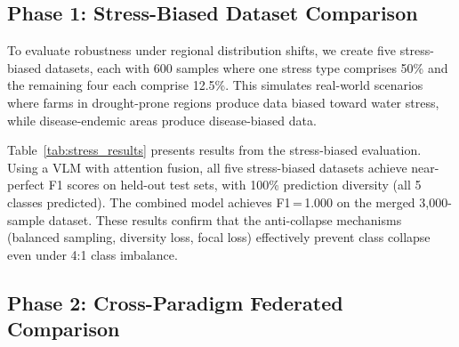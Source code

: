 \documentclass[10pt,journal,compsoc]{IEEEtran}
\begin{document}
\subsection{Phase 1: Stress-Biased Dataset Comparison}

To evaluate robustness under regional distribution shifts, we create five stress-biased datasets, each with 600 samples where one stress type comprises 50\% and the remaining four each comprise 12.5\%. This simulates real-world scenarios where farms in drought-prone regions produce data biased toward water stress, while disease-endemic areas produce disease-biased data.

\begin{table}[htbp]
\centering
\caption{Phase 1: Stress-Biased Dataset Results (Attention VLM)}
\label{tab:stress_results}
\small
{}
\end{table}

Table~\ref{tab:stress_results} presents results from the stress-biased evaluation. Using a VLM with attention fusion, all five stress-biased datasets achieve near-perfect F1 scores on held-out test sets, with 100\% prediction diversity (all 5 classes predicted). The combined model achieves F1\,=\,1.000 on the merged 3,000-sample dataset. These results confirm that the anti-collapse mechanisms (balanced sampling, diversity loss, focal loss) effectively prevent class collapse even under 4:1 class imbalance.

\subsection{Phase 2: Cross-Paradigm Federated Comparison}
\end{document}
